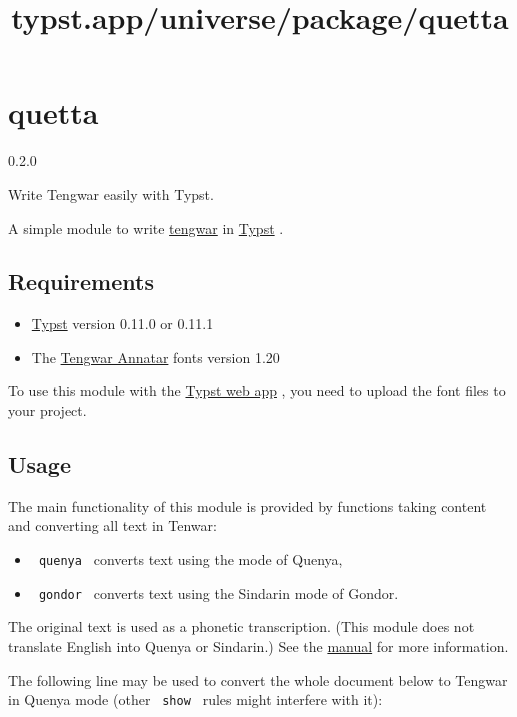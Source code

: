 \title{typst.app/universe/package/quetta}

\label{banner}
\section{quetta}\label{quetta}

{ 0.2.0 }

Write Tengwar easily with Typst.

\label{readme}
A simple module to write
\href{https://en.wikipedia.org/wiki/Tengwar}{tengwar} in
\href{https://typst.app/}{Typst} .

\subsection{Requirements}\label{requirements}

\begin{itemize}
\tightlist
\item
  \href{https://github.com/typst/typst}{Typst} version 0.11.0 or 0.11.1
\item
  The
  \href{https://www.fontspace.com/tengwar-annatar-font-f2244}{Tengwar
  Annatar} fonts version 1.20
\end{itemize}

To use this module with the \href{https://typst.app/}{Typst web app} ,
you need to upload the font files to your project.

\subsection{Usage}\label{usage}

The main functionality of this module is provided by functions taking
content and converting all text in Tenwar:

\begin{itemize}
\tightlist
\item
  \texttt{\ quenya\ } converts text using the mode of Quenya,
\item
  \texttt{\ gondor\ } converts text using the Sindarin mode of Gondor.
\end{itemize}

The original text is used as a phonetic transcription. (This module does
not translate English into Quenya or Sindarin.) See the
\href{https://github.com/FlorentCLMichel/quetta/blob/main/manual.pdf}{manual}
for more information.

The following line may be used to convert the whole document below to
Tengwar in Quenya mode (other \texttt{\ show\ } rules might interfere
with it):

